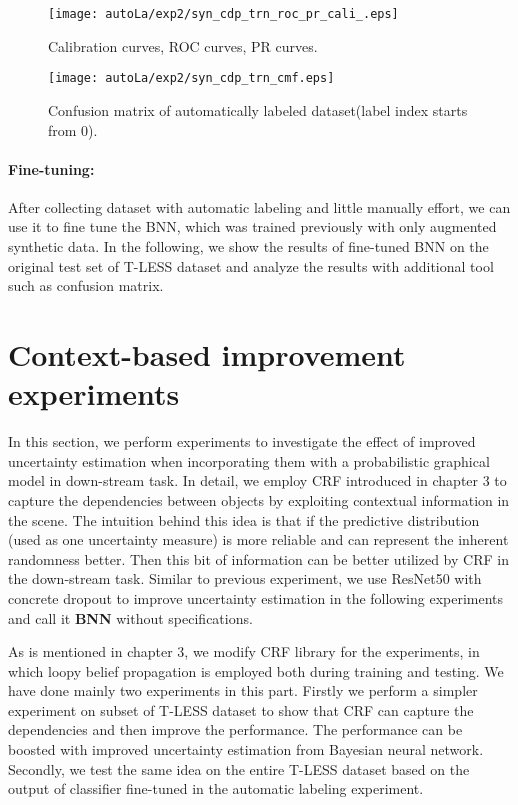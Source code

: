\begin{figure}[h!]
	\begin{center}
		\texttt{[image: autoLa/exp2/syn\_cdp\_trn\_roc\_pr\_cali\_.eps]}
		\caption{Calibration curves, ROC curves, PR curves.}		
		\label{autoLa_exp2_cali}
	\end{center}
\end{figure}


\begin{figure}[H]
	\centering
	\begin{center}
		\texttt{[image: autoLa/exp2/syn\_cdp\_trn\_cmf.eps]}
		\caption{Confusion matrix of automatically labeled dataset(label index starts from 0).}		
		\label{autoLa_exp2_cfm}
	\end{center}
\end{figure}

\paragraph{Fine-tuning:} After collecting dataset with automatic labeling and little manually effort, we can use it to fine tune the BNN, which was trained previously with only augmented synthetic data. In the following, we show the results of fine-tuned BNN on the original test set of T-LESS dataset and analyze the results with additional tool such as confusion matrix.  

\section{Context-based improvement experiments}
In this section, we perform experiments to investigate the effect of improved uncertainty estimation when incorporating them with a probabilistic graphical model in down-stream task. In detail, we employ CRF introduced in chapter 3 to capture the dependencies between objects by exploiting contextual information in the scene. The intuition behind this idea is that if the predictive distribution (used as one uncertainty measure) is more reliable and can represent the inherent randomness better. Then this bit of information can be better utilized by CRF in the down-stream task. Similar to previous experiment, we use ResNet50 with concrete dropout to improve uncertainty estimation in the following experiments and call it \textbf{BNN} without specifications.

As is mentioned in chapter 3, we modify CRF library \cite{Ruiz-Sarmiento-REACTS-2015} for the experiments, in which loopy belief propagation is employed both during training and testing. We have done mainly two experiments in this part. Firstly we perform a simpler experiment on subset of T-LESS dataset to show that CRF can capture the dependencies and then improve the performance. The performance can be boosted with improved uncertainty estimation from Bayesian neural network. Secondly, we test the same idea on the entire T-LESS dataset based on the output of classifier fine-tuned in the automatic labeling experiment. 


